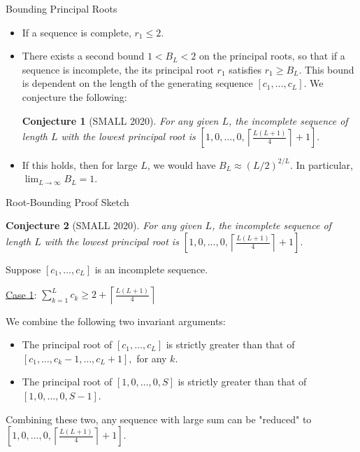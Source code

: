 \documentclass{beamer}
\newtheorem*{conjecture}{Conjecture}
\begin{document}
\begin{frame}{Bounding Principal Roots}
\begin{itemize}
\item If a sequence is complete, $r_1 \leq 2$.
\pause
\item There exists a second bound $1<B_L<2$ on the principal roots, so that if a sequence is incomplete, the  its principal root $r_1$ satisfies $r_1 \geq B_L$. This bound is dependent on the length of the generating sequence $[c_1, \ldots, c_L]$. We conjecture the following:
\begin{conjecture}[SMALL 2020]
For any given $L$, the incomplete sequence of length $L$ with the lowest principal root is $[1, 0, \ldots, 0, \left\lceil \frac{L(L+1)}{4}\right\rceil+1].$
\end{conjecture}
\pause
\item If this holds, then for large $L$, we would have $B_L \approx (L/2)^{2/L}$. In particular, $\lim_{L\rightarrow \infty}B_L=1$.
\end{itemize}
\end{frame}
\begin{frame}{Root-Bounding Proof Sketch}
\begin{conjecture}[SMALL 2020]
For any given $L$, the incomplete sequence of length $L$ with the lowest principal root is $[1, 0, \ldots, 0, \left\lceil \frac{L(L+1)}{4}\right\rceil+1].$
\end{conjecture}
\pause
Suppose $[c_1,\ldots,c_L]$ is an incomplete sequence.

\underline{Case 1}: $\sum_{k=1}^{L}c_k \geq 2+\left\lceil \frac{L(L+1) }{4} \right\rceil$

We combine the following two invariant arguments:
\pause
\begin{itemize}
\item The principal root of  $[c_1,\ldots, c_L]$ is strictly greater than that of $[c_1,\ldots,c_k-1,\ldots,c_L+1],$ for any $k$.
\pause
\item The principal root of $[1,0,\ldots,0,S]$ is strictly greater than that of $[1,0,\ldots,0,S-1]$.
\end{itemize}
\pause
Combining these two, any sequence with large sum can be "reduced" to $[1,0,\ldots,0,\left\lceil \frac{L(L+1) }{4} \right\rceil+1]$. 
\end{frame}
\end{document}
